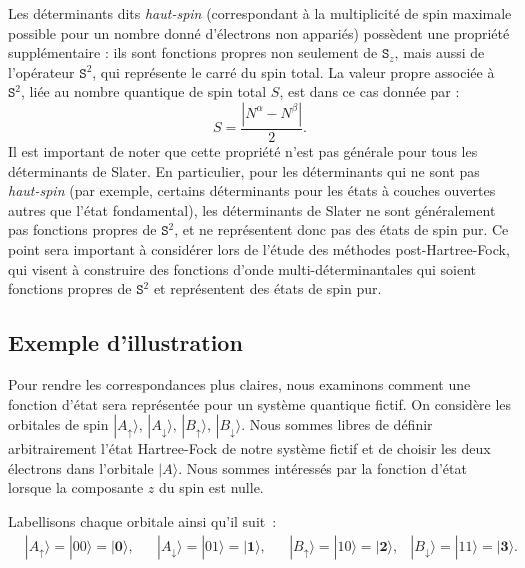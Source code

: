\documentclass[12pt,a4paper]{article} %
\numberwithin{equation}{section} %
\numberwithin{figure}{section} %
\numberwithin{table}{section} %
\begin{document}
Les déterminants dits \textit{haut-spin} (correspondant à la multiplicité de spin maximale possible pour un nombre donné d'électrons non appariés) possèdent une propriété supplémentaire : ils sont fonctions propres non seulement de $ \mathtt{S}_z$, mais aussi de l'opérateur $ \mathtt{S}^2$, qui représente le carré du spin total.  La valeur propre associée à $ \mathtt{S}^2$, liée au nombre quantique de spin total $S$, est dans ce cas donnée par :
\begin{equation}
    S = \frac{|N^\alpha - N^\beta|}{2}.
\end{equation}
Il est important de noter que cette propriété n'est pas générale pour tous les déterminants de Slater.  En particulier, pour les déterminants qui ne sont pas \textit{haut-spin} (par exemple, certains déterminants pour les états à couches ouvertes autres que l'état fondamental), les déterminants de Slater ne sont généralement pas fonctions propres de $ \mathtt{S}^2$, et ne représentent donc pas des états de spin pur. Ce point sera important à considérer lors de l'étude des méthodes post-Hartree-Fock, qui visent à construire des fonctions d'onde multi-déterminantales qui soient fonctions propres de $\mathtt{S}^2$ et représentent des états de spin pur.

\subsection{Exemple d'illustration}\label{exemple-dillustration}

Pour rendre les correspondances plus claires, nous examinons comment une fonction d'état sera représentée pour un système quantique fictif. On considère les orbitales de spin
$|A_\uparrow\rangle,\,|A_\downarrow\rangle,\,|B_\uparrow\rangle,\,|B_\downarrow\rangle$. Nous sommes libres de définir arbitrairement l'état Hartree-Fock de notre système fictif et de choisir les deux électrons dans l'orbitale $|A\rangle$. Nous sommes intéressés par la fonction d'état lorsque la composante $z$ du spin est nulle.

Labellisons chaque orbitale ainsi qu'il suit~:
\begin{align}
 &|A_\uparrow\rangle=|00\rangle=|\mathbf{0}\rangle,  &&|A_\downarrow\rangle=|01\rangle=|\mathbf{1}\rangle,
&&|B_\uparrow\rangle=|10\rangle=|\mathbf{2}\rangle,  &|B_\downarrow\rangle=|11\rangle=|\mathbf{3}\rangle.
\end{align}
\end{document}
